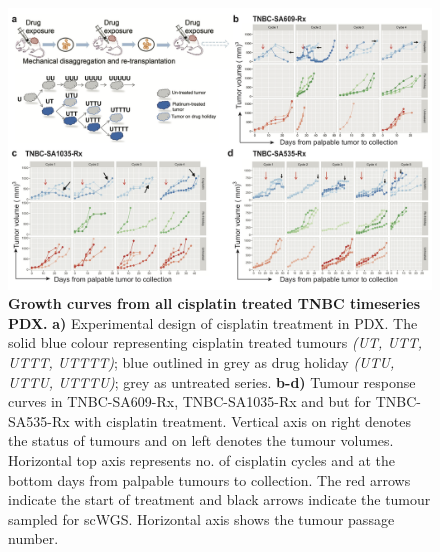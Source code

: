 \begin{figure}
\centering
\includegraphics[width=\textwidth]{Figures/chap4/SA609allcyclescisplatin.png}
	
\caption[Representative growth curves from TNBC-SA609 treated with cisplatin]
	{\small
	\textbf{Growth curves from all cisplatin treated TNBC timeseries PDX.}
	   \textbf{a)} Experimental design of cisplatin treatment in PDX. The solid blue colour representing cisplatin treated tumours \textit{(UT, UTT, UTTT, UTTTT)}; blue outlined in grey as drug holiday \textit{(UTU, UTTU, UTTTU)}; grey as untreated series. \textbf{b-d)} Tumour response curves in TNBC-SA609-Rx, TNBC-SA1035-Rx and but for TNBC-SA535-Rx with cisplatin treatment. Vertical axis on right denotes the status of tumours and on left denotes the tumour volumes. Horizontal top axis represents no. of cisplatin cycles and at the bottom days from palpable tumours to collection. The red arrows indicate the start of treatment and black arrows indicate the tumour sampled for scWGS. Horizontal axis shows the tumour passage number.}
	
	\label{fig:SA609allcyclescisplatin}
\end{figure}

